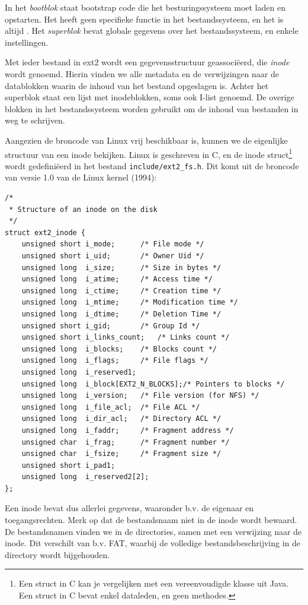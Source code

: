In het \emph{bootblok} staat bootstrap code die het besturingssysteem moet laden en opstarten.
Het heeft geen specifieke functie in het bestandssysteem, en het is altijd . Het \emph{superblok} bevat globale
gegevens over het bestandssysteem, en enkele instellingen.

Met ieder bestand in ext2 wordt een gegevensstructuur geassoci\"eerd, die \emph{inode} wordt genoemd.
Hierin vinden we alle metadata en de verwijzingen naar de datablokken waarin de inhoud
van het bestand opgeslagen is. Achter het superblok staat een lijst met inodeblokken, soms ook
I-list genoemd. De overige blokken in het bestandssysteem worden gebruikt om de inhoud van bestanden
in weg te schrijven.

Aangezien de broncode van Linux vrij beschikbaar is, kunnen we de eigenlijke structuur van een inode
bekijken. Linux is geschreven in C, en de inode struct\footnote{Een struct in C kan je vergelijken
met een vereenvoudigde klasse uit Java. Een struct in C bevat enkel dataleden, en geen methodes.}
wordt gedefini\"eerd in het bestand \verb|include/ext2_fs.h|. Dit komt uit de broncode van versie 1.0
van de Linux kernel (1994):

\begin{verbatim}
/*
 * Structure of an inode on the disk
 */
struct ext2_inode {
    unsigned short i_mode;      /* File mode */
    unsigned short i_uid;       /* Owner Uid */
    unsigned long  i_size;      /* Size in bytes */
    unsigned long  i_atime;     /* Access time */
    unsigned long  i_ctime;     /* Creation time */
    unsigned long  i_mtime;     /* Modification time */
    unsigned long  i_dtime;     /* Deletion Time */
    unsigned short i_gid;       /* Group Id */
    unsigned short i_links_count;   /* Links count */
    unsigned long  i_blocks;    /* Blocks count */
    unsigned long  i_flags;     /* File flags */
    unsigned long  i_reserved1;
    unsigned long  i_block[EXT2_N_BLOCKS];/* Pointers to blocks */
    unsigned long  i_version;   /* File version (for NFS) */
    unsigned long  i_file_acl;  /* File ACL */
    unsigned long  i_dir_acl;   /* Directory ACL */
    unsigned long  i_faddr;     /* Fragment address */
    unsigned char  i_frag;      /* Fragment number */
    unsigned char  i_fsize;     /* Fragment size */
    unsigned short i_pad1;
    unsigned long  i_reserved2[2];
};
\end{verbatim}

Een inode bevat dus allerlei gegevens, waaronder b.v. de eigenaar en toegangsrechten. Merk op
dat de bestandsnaam niet in de inode wordt bewaard. De bestandsnamen vinden we in de directories,
samen met een verwijzing naar de inode. Dit verschilt van b.v. FAT, waarbij de volledige
bestandsbeschrijving in de directory wordt bijgehouden.


